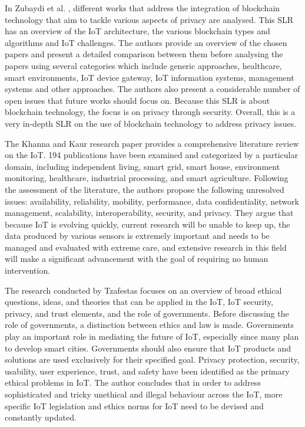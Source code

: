 In Zubaydi et al. \cite{zubaydi2023leveraging}, different works that address the
integration of blockchain technology that aim to tackle various aspects of privacy
are analysed. This SLR has an overview of the IoT architecture, the various blockchain
types and algorithms and IoT challenges. The authors provide an overview of the
chosen papers and present a detailed comparison between them before analysing
the papers using several categories which include generic approaches, healthcare,
smart environments, IoT device gateway, IoT information systems, management systems
and other approaches. The authors also present a considerable number of open issues
that future works should focus on. Because this SLR is about blockchain technology,
the focus is on privacy through security. Overall, this is a very in-depth SLR on the
use of blockchain technology to address privacy issues.

The Khanna and Kaur \cite{khanna2020internet} research paper provides a comprehensive
literature review on the IoT. 194 publications have been examined and categorized
by a particular domain, including independent living, smart grid, smart house,
environment monitoring, healthcare, industrial processing, and smart agriculture.
Following the assessment of the literature, the authors propose the following
unresolved issues: availability, reliability, mobility, performance, data
confidentiality, network management, scalability, interoperability, security,
and privacy. They argue that because IoT is evolving quickly, current research
will be unable to keep up, the data produced by various sensors is extremely
important and needs to be managed and evaluated with extreme care, and extensive
research in this field will make a significant advancement with the goal of
requiring no human intervention.

The research conducted by Tzafestas \cite{tzafestas2018ethics} focuses on
an overview of broad ethical questions, ideas, and theories that can be
applied in the IoT, IoT security, privacy, and trust elements, and the role
of governments. Before discussing the role of governments, a distinction
between ethics and law is made. Governments play an important role in mediating
the future of IoT, especially since many plan to develop smart cities.
Governments should also ensure that IoT products and solutions are used
exclusively for their specified goal. Privacy protection, security, usability,
user experience, trust, and safety have been identified as the primary
ethical problems in IoT. The author concludes that in order to address
sophisticated and tricky unethical and illegal behaviour across the IoT,
more specific IoT legislation and ethics norms for IoT need to be devised
and constantly updated.

